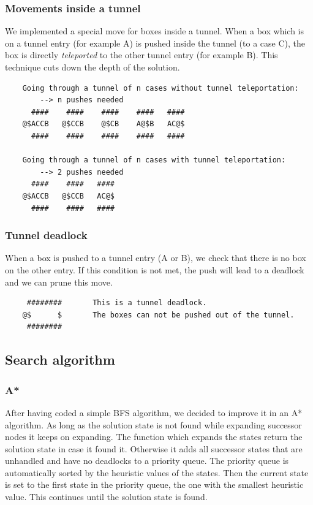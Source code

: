 \documentclass[a4paper,10pt]{article}
\begin{document}
	\subsubsection{Movements inside a tunnel}
	We implemented a special move for boxes inside a tunnel. 
	When a box which is on a tunnel entry (for example A) is pushed inside the tunnel (to a case C), the
	box is directly \textit{teleported} to the other tunnel entry (for example B).
	This technique cuts down the depth of the solution.

	\begin{verbatim}
	Going through a tunnel of n cases without tunnel teleportation: 
	    --> n pushes needed
	  ####    ####    ####    ####   ####
	@$ACCB   @$CCB    @$CB    A@$B   AC@$
	  ####    ####    ####    ####   ####

	Going through a tunnel of n cases with tunnel teleportation: 
	    --> 2 pushes needed
	  ####    ####   ####
	@$ACCB   @$CCB   AC@$
	  ####    ####   ####

	\end{verbatim}

	\subsubsection{Tunnel deadlock}
	When a box is pushed to a tunnel entry (A or B), we check that there is no box on the other entry.
	If this condition is not met, the push will lead to a deadlock and we can prune this move.

	\begin{verbatim}
	 ########       This is a tunnel deadlock.
	@$      $       The boxes can not be pushed out of the tunnel.
	 ########       
	\end{verbatim}

	\subsection{Search algorithm}
	\subsubsection{A*}
	After having coded a simple BFS algorithm, we decided to improve it in an A* algorithm. 
	As long as the solution state is not found while expanding successor nodes it keeps on expanding. The function which expands the states return the solution state in case it found it. Otherwise it adds all successor states that are unhandled and have no deadlocks to a priority queue. 
	The priority queue is automatically sorted by the heuristic values of the states. 
	Then the current state is set to the first state in the priority queue, the one with the smallest heuristic value. 
	This continues until the solution state is found.
	
\end{document}
